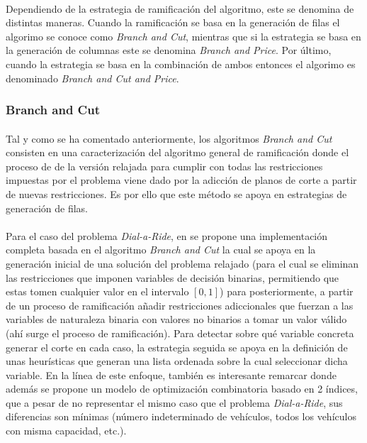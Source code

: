 \documentclass{subfiles}
\begin{document}
        \paragraph{}
        Dependiendo de la estrategia de ramificación del algoritmo, este se denomina de distintas maneras. Cuando la ramificación se basa en la generación de filas el algorimo se conoce como \emph{Branch and Cut}, mientras que si la estrategia se basa en la generación de columnas este se denomina \emph{Branch and Price}. Por último, cuando la estrategia se basa en la combinación de ambos entonces el algorimo es denominado \emph{Branch and Cut and Price}.

        \subsubsection{Branch and Cut}
        \label{sec:solving_branch_cut}

          \paragraph{}
          Tal y como se ha comentado anteriormente, los algoritmos \emph{Branch and Cut} consisten en una caracterización del algoritmo general de ramificación donde el proceso de  de la versión relajada para cumplir con todas las restricciones impuestas por el problema viene dado por la adicción de planos de corte a partir de nuevas restricciones. Es por ello que este método se apoya en estrategias de generación de filas.

          \paragraph{}
          Para el caso del problema \emph{Dial-a-Ride}, en \cite{cordeau2006branch} se propone una implementación completa basada en el algoritmo \emph{Branch and Cut} la cual se apoya en la generación inicial de una solución del problema relajado (para el cual se eliminan las restricciones que imponen variables de decisión binarias, permitiendo que estas tomen cualquier valor en el intervalo $[0, 1]$) para posteriormente, a partir de un proceso de ramificación añadir restricciones adiccionales que fuerzan a las variables de naturaleza binaria con valores no binarios a tomar un valor válido (ahí surge el proceso de ramificación). Para detectar sobre qué variable concreta generar el corte en cada caso, la estrategia seguida se apoya en la definición de unas heurísticas que generan una lista ordenada sobre la cual seleccionar dicha variable. En la línea de este enfoque, también es interesante remarcar \cite{ropke2007models} donde además se propone un modelo de optimización combinatoria basado en 2 índices, que a pesar de no representar el mismo caso que el problema \emph{Dial-a-Ride}, sus diferencias son mínimas (número indeterminado de vehículos, todos los vehículos con misma capacidad, etc.).
\end{document}
